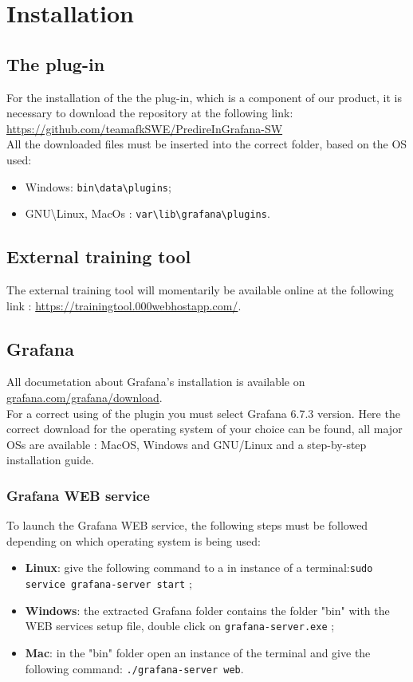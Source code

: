 \section{Installation}
\subsection{The plug-in}
For the installation of the the plug-in, which is a component of our product,  it is necessary to download the repository at the following link:\\ \url{https://github.com/teamafkSWE/PredireInGrafana-SW}\\
All the downloaded files must be inserted into the correct folder, based on the OS used:
\begin{itemize} 
\item Windows: \texttt{bin\textbackslash data\textbackslash plugins};
\item GNU\textbackslash Linux, MacOs : \texttt{var\textbackslash lib\textbackslash grafana\textbackslash plugins}.
\end{itemize}

\subsection{External training tool}
The external training tool will momentarily be available online at the following link : \url{https://trainingtool.000webhostapp.com/}.\\

\subsection{Grafana}
All documetation about Grafana's installation is available on  \url{grafana.com/grafana/download}.\\For a correct using of the plugin you must select Grafana 6.7.3 version.
Here the correct download for the operating system of your choice can be found, all major OSs are available : MacOS, Windows and GNU\slash Linux and a step-by-step installation guide.
\subsubsection{Grafana WEB service}

To launch the Grafana WEB service, the following steps must be followed depending on which operating system is being used:

\begin{itemize}
\item\textbf{Linux}: give the following command to a in instance of a terminal:\texttt{sudo service grafana-server start} ;
\item\textbf{Windows}: the extracted Grafana folder contains the folder "bin" with the WEB services setup file, double click on \texttt{grafana-server.exe} ;
\item\textbf{Mac}: in the "bin" folder open an instance of the  terminal and give the following command: \texttt{./grafana-server web}.
\end{itemize}

